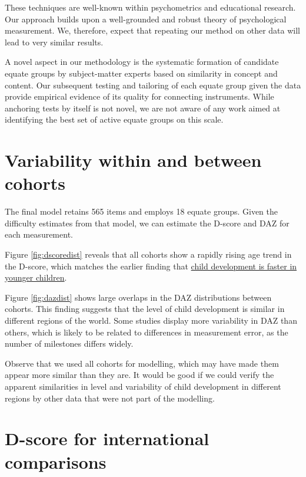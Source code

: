 \documentclass[
]{book}
\begin{document}
These techniques are well-known within psychometrics and educational research. Our approach builds upon a well-grounded and robust theory of psychological measurement. We, therefore, expect that repeating our method on other data will lead to very similar results.

A novel aspect in our methodology is the systematic formation of candidate equate groups by subject-matter experts based on similarity in concept and content. Our subsequent testing and tailoring of each equate group given the data provide empirical evidence of its quality for connecting instruments. While anchoring tests by itself is not novel, we are not aware of any work aimed at identifying the best set of active equate groups on this scale.

\hypertarget{sec:variability}{%
\section{Variability within and between cohorts}\label{sec:variability}}

The final model retains 565 items and employs 18 equate groups. Given the difficulty estimates from that model, we can estimate the D-score and DAZ for each measurement.

Figure \ref{fig:dscoredist} reveals that all cohorts show a rapidly rising age trend in the D-score, which matches the earlier finding that \href{https://d-score.org/dbook1/sec-probage.html}{child development is faster in younger children}.

Figure \ref{fig:dazdist} shows large overlaps in the DAZ distributions between cohorts. This finding suggests that the level of child development is similar in different regions of the world. Some studies display more variability in DAZ than others, which is likely to be related to differences in measurement error, as the number of milestones differs widely.

Observe that we used all cohorts for modelling, which may have made them appear more similar than they are. It would be good if we could verify the apparent similarities in level and variability of child development in different regions by other data that were not part of the modelling.

\hypertarget{sec:internationalcomparisons}{%
\section{D-score for international comparisons}\label{sec:internationalcomparisons}}
\end{document}
